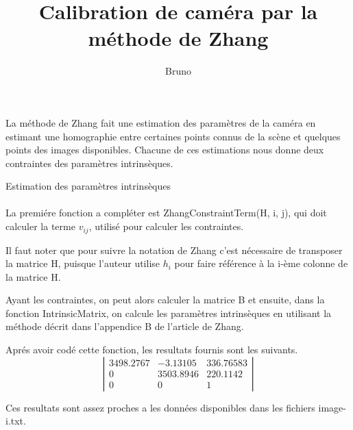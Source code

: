 \documentclass[a4paper,10pt]{article}
\title{Calibration de caméra par la méthode de Zhang}
\author{Bruno \bsc{Ordozgoiti}}
\begin{document}
\maketitle

La méthode de Zhang fait une estimation des paramètres de la caméra en estimant une homographie entre certaines points connus de la scène et quelques points des images disponibles. Chacune de ces estimations nous donne deux contraintes des paramètres intrinsèques.
\begin{paragraph}{Estimation des paramètres intrinsèques}~ \\
\\
La premiére fonction a compléter est ZhangConstraintTerm(H, i, j), qui doit calculer la terme $ v_{ij}$, utilisé pour calculer les contraintes.

Il faut noter que pour suivre la notation de Zhang c'est nécessaire de transposer la matrice H, puisque l'auteur utilise $h_i$ pour faire référence à la i-ème colonne de la matrice H.

Ayant les contraintes, on peut alors calculer la matrice B et ensuite, dans la fonction IntrinsicMatrix, on calcule les paramètres intrinsèques en utilisant la méthode décrit dans l'appendice B de l'article de Zhang. 

Aprés avoir codé cette fonction, les resultats fournis sont les suivants.
$$
\left| \begin{array}{ccc}
    3498.2767  & - 3.13105    &  336.76583 \\  
    0         &  3503.8946   &  220.1142   \\
    0         &  0          &  1         
 
 \end{array}
\right|
$$

Ces resultats sont assez proches a les données disponibles dans les fichiers image-i.txt.

\end{paragraph}
\end{document}
